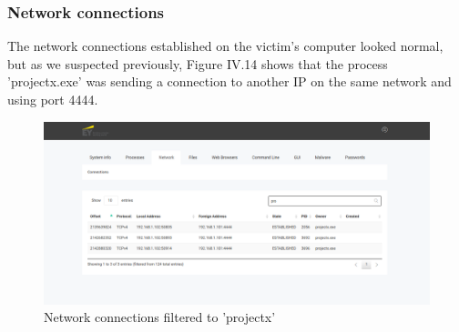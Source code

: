 \subsubsection{Network connections}
The network connections established on the victim's computer looked normal, but as we suspected previously, Figure IV.14 shows that the process 'projectx.exe' was sending a connection to another IP on the same network and using port 4444.
\begin{figure}[H]
\centering
\includegraphics[width=0.9\columnwidth]{Figures/14.png}
\caption{Network connections filtered to 'projectx'}
\end{figure}
